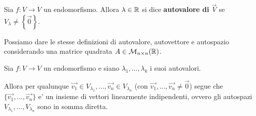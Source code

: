 \begin{definition}
    Sia $f : V \to V$ un endomorfismo. Allora $\lambda \in \mathbb{R}$ si dice \textbf{autovalore di $\vec{V}$} se $V_{\lambda} \neq \left\{ \vec{0}\right\}$.
\end{definition}

Possiamo dare le stesse definizioni di autovalore, autovettore e autospazio considerando una matrice quadrata $A \in \mathcal{M}_{n \times n}(\mathbb{R})$.

\begin{theorem}
    Sia $f : V \to V$ un endomorfismo e siano $\lambda_1, \dots, \lambda_k$ i suoi autovalori.

    Allora per qualunque $\vec{v_1} \in V_{\lambda_{1}}, \dots, \vec{v_n} \in V_{\lambda_n}$ (con $\vec{v_1}, \dots, \vec{v_n} \neq \vec 0$) segue che $\{\vec{v_1}, \dots, \vec{v_n}\}$ e' un insieme di vettori linearmente indipendenti, ovvero gli autospazi $V_{\lambda_1}, \dots, V_{\lambda_{n}}$ sono in somma diretta.
\end{theorem}
